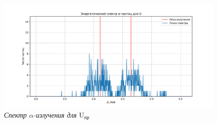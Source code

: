 \documentclass[a4paper,12pt]{article}
\begin{document}
\begin{figure}[!ht]
	\includegraphics[width=1.1\textwidth]{plots/specter_U.pdf}
	\caption{\textit{Спектр $\alpha$-излучения для $\text{U}_\text{пр}$}}
	\label{graph:U}
\end{figure}
\FloatBarrier
\end{document}
